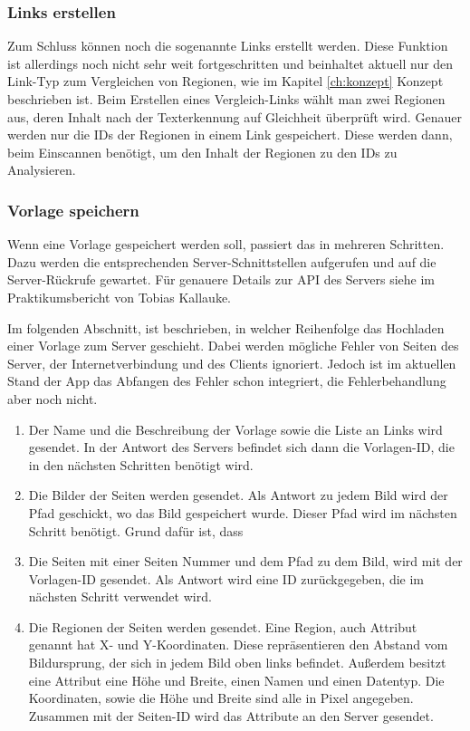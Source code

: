 \documentclass[nomenclature, oneside, 150]{HSMW-Thesis}
\begin{document}
			\subsubsection{Links erstellen}
			Zum Schluss können noch die sogenannte Links erstellt werden. Diese Funktion ist allerdings noch nicht sehr weit fortgeschritten und beinhaltet aktuell nur den Link-Typ zum Vergleichen von Regionen, wie im Kapitel \ref{ch:konzept} Konzept beschrieben ist. Beim Erstellen eines Vergleich-Links wählt man zwei Regionen aus, deren Inhalt nach der Texterkennung auf Gleichheit überprüft wird. Genauer werden nur die IDs der Regionen in einem Link gespeichert. Diese werden dann, beim Einscannen benötigt, um den Inhalt der Regionen zu den IDs zu Analysieren. 
		
			\subsubsection{Vorlage speichern}
			Wenn eine Vorlage gespeichert werden soll, passiert das in mehreren Schritten. Dazu werden die entsprechenden Server-Schnittstellen aufgerufen und auf die Server-Rückrufe gewartet. Für genauere Details zur API des Servers siehe im Praktikumsbericht von Tobias Kallauke.
			
			Im folgenden Abschnitt, ist beschrieben, in welcher Reihenfolge das Hochladen einer Vorlage zum Server geschieht. Dabei werden mögliche Fehler von Seiten des Server, der Internetverbindung und des Clients ignoriert. Jedoch ist im aktuellen Stand der App das Abfangen des Fehler schon integriert, die Fehlerbehandlung aber noch nicht.
			\begin{enumerate}
				\item Der Name und die Beschreibung der Vorlage sowie die Liste an Links wird gesendet. In der Antwort des Servers befindet sich dann die Vorlagen-ID, die in den nächsten Schritten benötigt wird. 
				\item Die Bilder der Seiten werden gesendet. Als Antwort zu jedem Bild wird der Pfad geschickt, wo das Bild gespeichert wurde. Dieser Pfad wird im nächsten Schritt benötigt. Grund dafür ist, dass
				\item Die Seiten mit einer Seiten Nummer und dem Pfad zu dem Bild, wird mit der Vorlagen-ID gesendet. Als Antwort wird eine ID zurückgegeben, die im nächsten Schritt verwendet wird.
				\item Die Regionen der Seiten werden gesendet. Eine Region, auch Attribut genannt hat X- und Y-Koordinaten. Diese repräsentieren den Abstand vom Bildursprung, der sich in jedem Bild oben links befindet. Außerdem besitzt eine Attribut eine Höhe und Breite, einen Namen und einen Datentyp. Die Koordinaten, sowie die Höhe und Breite sind alle in Pixel angegeben. Zusammen mit der Seiten-ID wird das Attribute an den Server gesendet.
			\end{enumerate}
			
\end{document}
